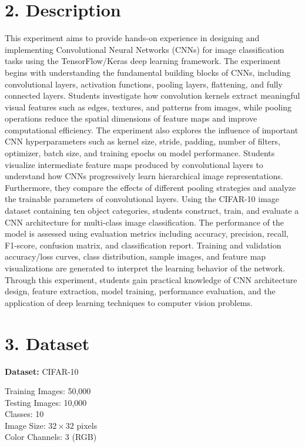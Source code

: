 \documentclass[11pt]{article}
\begin{document}
\section*{2. Description}
This experiment aims to provide hands-on experience in designing and implementing Convolutional Neural Networks (CNNs) for image classification tasks using the TensorFlow/Keras deep learning framework. The experiment begins with understanding the fundamental building blocks of CNNs, including convolutional layers, activation functions, pooling layers, flattening, and fully connected layers. Students investigate how convolution kernels extract meaningful visual features such as edges, textures, and patterns from images, while pooling operations reduce the spatial dimensions of feature maps and improve computational efficiency. The experiment also explores the influence of important CNN hyperparameters such as kernel size, stride, padding, number of filters, optimizer, batch size, and training epochs on model performance. Students visualize intermediate feature maps produced by convolutional layers to understand how CNNs progressively learn hierarchical image representations. Furthermore, they compare the effects of different pooling strategies and analyze the trainable parameters of convolutional layers. Using the CIFAR-10 image dataset containing ten object categories, students construct, train, and evaluate a CNN architecture for multi-class image classification. The performance of the model is assessed using evaluation metrics including accuracy, precision, recall, F1-score, confusion matrix, and classification report. Training and validation accuracy/loss curves, class distribution, sample images, and feature map visualizations are generated to interpret the learning behavior of the network. Through this experiment, students gain practical knowledge of CNN architecture design, feature extraction, model training, performance evaluation, and the application of deep learning techniques to computer vision problems.



\section*{3. Dataset}

\textbf{Dataset:} CIFAR-10

Training Images: 50,000 \\
Testing Images: 10,000 \\
Classes: 10 \\
Image Size: $32 \times 32$ pixels \\
Color Channels: 3 (RGB)
\end{document}
